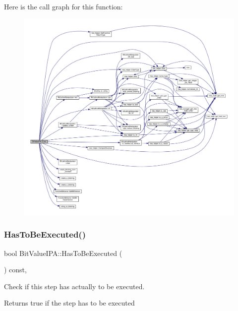Here is the call graph for this function\+:
\nopagebreak
\begin{figure}[H]
\begin{center}
\leavevmode
\includegraphics[width=350pt]{da/d6c/classBitValueIPA_a83d4228b39c126b0007701f32409a71c_cgraph}
\end{center}
\end{figure}
\mbox{\label{classBitValueIPA_aaf4e7bb4cee74b03ae5e8fd94e593f2d}} 
\subsubsection{\texorpdfstring{Has\+To\+Be\+Executed()}{HasToBeExecuted()}}
{\footnotesize\ttfamily bool Bit\+Value\+I\+P\+A\+::\+Has\+To\+Be\+Executed (\begin{DoxyParamCaption}{ }\end{DoxyParamCaption}) const\hspace{0.3cm}{\ttfamily [override]}, {\ttfamily [virtual]}}



Check if this step has actually to be executed. 

\begin{DoxyReturn}{Returns}
true if the step has to be executed 
\end{DoxyReturn}


